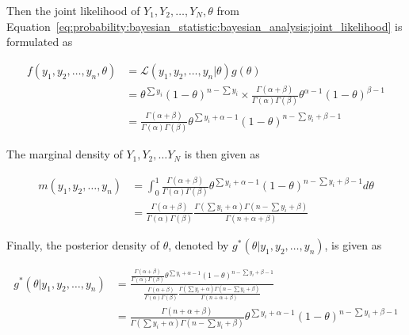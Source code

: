 Then the joint likelihood of $Y_{1}, Y_{2}, \dots, Y_{N}, \theta$ from Equation~\eqref{eq:probability:bayesian_statistic:bayesian_analysis:joint_likelihood} is formulated as

\begin{equation}
      \label{eq:probability:bayesian_statistic:bayesian_analysis:step_3}
      \begin{split}
            f(y_{1}, y_{2}, \dots, y_{n}, \theta)
            &= \mathcal{L}(y_{1}, y_{2}, \dots, y_{n} \vert \theta)g(\theta)\\
            &= \theta^{\sum y_{i}}(1-\theta)^{n-\sum y_{i}} \times \frac{\Gamma(\alpha + \beta)}{\Gamma(\alpha)\Gamma(\beta)}\theta^{\alpha - 1}(1 - \theta)^{\beta  - 1}\\
            &= \frac{\Gamma(\alpha + \beta)}{\Gamma(\alpha)\Gamma(\beta)}\theta^{\sum y_{i} + \alpha - 1}(1-\theta)^{n - \sum y_{i} + \beta - 1}
      \end{split}
\end{equation}

The marginal density of $Y_{1}, Y_{2}, \dots Y_{N}$ is then given as

\begin{equation}
      \label{eq:probability:bayesian_statistic:bayesian_analysis:step_4}
      \begin{split}
            m(y_{1}, y_{2}, \dots, y_{n})
            &= \int_{0}^{1}\frac{\Gamma(\alpha + \beta)}{\Gamma(\alpha)\Gamma(\beta)}\theta^{\sum y_{i} + \alpha - 1}(1-\theta)^{n - \sum y_{i} + \beta - 1}d\theta\\
            &= \frac{\Gamma(\alpha + \beta)}{\Gamma(\alpha)\Gamma(\beta)}\frac{\Gamma(\sum y_{i} + \alpha)\Gamma(n - \sum y_{i} + \beta)}{\Gamma(n + \alpha + \beta)}
      \end{split}
\end{equation}

Finally, the posterior density of $\theta$, denoted by $g^{*}(\theta \vert y_{1}, y_{2}, \dots, y_{n})$, is given as

\begin{equation}
      \label{eq:probability:bayesian_statistic:bayesian_analysis:step_5}
      \begin{split}
            g^{*}(\theta \vert y_{1}, y_{2}, \dots, y_{n})
            &= \frac{\frac{\Gamma(\alpha + \beta)}{\Gamma(\alpha)\Gamma(\beta)}\theta^{\sum y_{i} + \alpha - 1}(1-\theta)^{n - \sum y_{i} + \beta - 1}}{\frac{\Gamma(\alpha + \beta)}{\Gamma(\alpha)\Gamma(\beta)}\frac{\Gamma(\sum y_{i} + \alpha)\Gamma(n - \sum y_{i} + \beta)}{\Gamma(n + \alpha + \beta)}}\\
            &= \frac{\Gamma(n + \alpha + \beta)}{\Gamma(\sum y_{i} + \alpha)\Gamma(n - \sum y_{i} + \beta)}\theta^{\sum y_{i} + \alpha - 1}(1-\theta)^{n - \sum y_{i} + \beta - 1}
      \end{split}
\end{equation}

